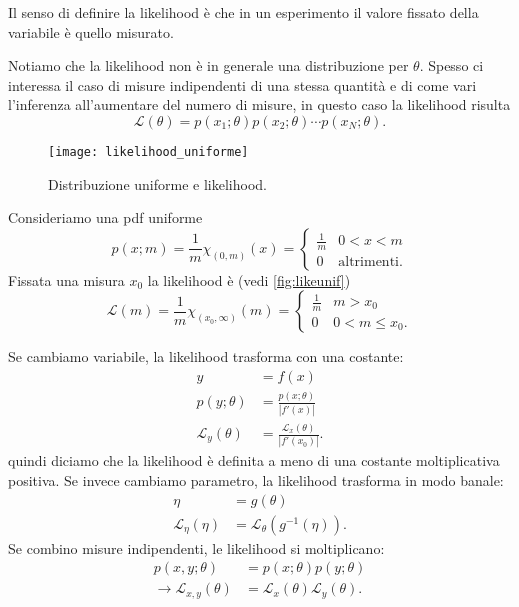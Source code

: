 Il senso di definire la likelihood
è che in un esperimento il valore fissato della variabile è quello misurato.

Notiamo che la likelihood non è in generale una distribuzione per $\theta$.
Spesso ci interessa il caso di misure indipendenti di una stessa quantità e di
come vari l'inferenza all'aumentare del numero di misure, in questo caso la
likelihood risulta
%
\begin{equation*}
	\mathcal L(\theta) = p(x_1;\theta) p(x_2;\theta) \dotsm p(x_N;\theta).
\end{equation*}

\begin{example}
	\begin{figure}
		\centering
		\texttt{[image: likelihood\_uniforme]}
		\caption{\label{fig:likeunif}%
		Distribuzione uniforme e likelihood.}
	\end{figure}
	Consideriamo una pdf uniforme
	\begin{equation*}
		p(x;m)
		= \frac1m \chi_{(0,m)}(x)
		= \begin{cases}
			\frac 1m & 0<x<m \\
			0 & \text{altrimenti.}
		\end{cases}
	\end{equation*}
	Fissata una misura $x_0$ la likelihood è (vedi \autoref{fig:likeunif})
	\begin{equation*}
		\mathcal L(m)
		= \frac1m \chi_{(x_0,\infty)}(m)
		= \begin{cases}
			\frac 1m & m > x_0 \\
			0 & 0 < m \le x_0.
		\end{cases}
	\end{equation*}
\end{example}

Se cambiamo variabile, la likelihood trasforma con una costante:
\begin{align*}
	y &= f(x) \\
	p(y;\theta) &= \frac{p(x;\theta)}{|f'(x)|} \\
	\mathcal L_y(\theta) &= \frac{\mathcal L_x(\theta)}{|f'(x_0)|}.
\end{align*}
quindi diciamo che la likelihood è definita a meno di una costante moltiplicativa positiva.
Se invece cambiamo parametro, la likelihood trasforma in modo banale:
\begin{align*}
	\eta &= g(\theta) \\
	\mathcal L_\eta(\eta) &= \mathcal L_\theta(g^{-1}(\eta)).
\end{align*}
Se combino misure indipendenti, le likelihood si moltiplicano:
\begin{align*}
	p(x,y;\theta) &= p(x;\theta) p(y;\theta) \\
	\rightarrow \mathcal L_{x,y}(\theta) &= \mathcal L_x(\theta) \mathcal L_y(\theta).
\end{align*}

